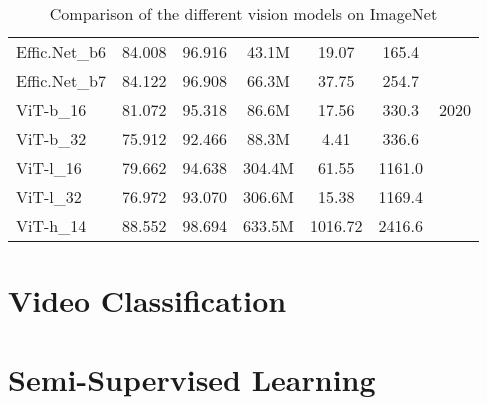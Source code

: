 \begin{table}[h]
\begin{tabular}{l|c|c|c|c|c|c}
        Effic.Net\_b6 & 84.008 & 96.916 & 43.1M & 19.07 & 165.4 & \\
        Effic.Net\_b7 & 84.122 & 96.908 & 66.3M & 37.75 & 254.7 & \\
        \hline
        ViT-b\_16 & 81.072 & 95.318 & 86.6M & 17.56 & 330.3 & 2020 \\
        ViT-b\_32 & 75.912 & 92.466 & 88.3M & 4.41 & 336.6 & \\
        ViT-l\_16 & 79.662 & 94.638 & 304.4M & 61.55 & 1161.0 & \\
        ViT-l\_32 & 76.972 & 93.070 & 306.6M & 15.38 & 1169.4 & \\
        ViT-h\_14 & 88.552 & 98.694 & 633.5M & 1016.72 & 2416.6 & \\
        \hline
    \end{tabular}
    \caption{Comparison of the different vision models on ImageNet}
    \label{tab:cnn_comparison}
\end{table}


\section{Video Classification}

\section{Semi-Supervised Learning}
